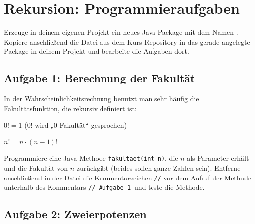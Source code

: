 \clearpage

\rehead[]{\textcolor{lightblue}{AvHG, Inf, My}}
\lohead[]{\textcolor{lightblue}{AvHG, Inf, My}}

\section{Rekursion: Programmieraufgaben}

Erzeuge in deinem eigenen Projekt ein neues Java-Package mit dem Namen
. Kopiere anschließend die Datei 
aus dem Kurs-Repository in das gerade angelegte Package in deinem Projekt und bearbeite
die Aufgaben dort.

\subsection{Aufgabe 1: Berechnung der Fakultät}

In der Wahrscheinlichkeitsrechnung benutzt man sehr häufig die Fakultätsfunktion, die rekursiv definiert ist:

$0! = 1$ \hspace{2cm} (0! wird „0 Fakultät“ gesprochen)

$n! = n \cdot (n-1)!$

Programmiere eine Java-Methode \lstinline|fakultaet(int n)|, die $n$ als Parameter
erhält und die Fakultät von $n$ zurückgibt (beides sollen ganze Zahlen sein).
Entferne anschließend in der Datei die Kommentarzeichen \lstinline|//| vor dem Aufruf der Methode unterhalb des
Kommentars \glqq\lstinline|// Aufgabe 1|\grqq\ und teste die Methode.


\subsection{Aufgabe 2: Zweierpotenzen}

